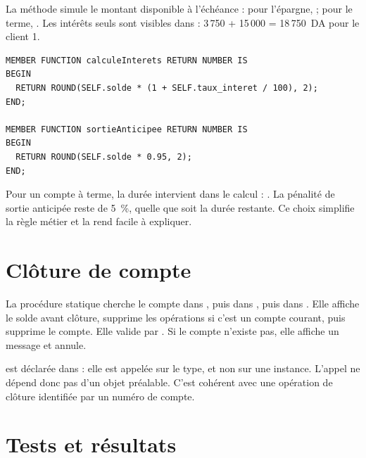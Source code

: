 \begin{clebox}
La méthode simule le montant disponible à l'échéance : pour l'épargne,
 ; pour le terme,
. Les intérêts seuls sont visibles
dans  : 3\,750 + 15\,000 = 18\,750~DA pour le client 1.
\end{clebox}

\begin{lstlisting}[caption={Calcul des intérêts et de la sortie anticipée.},label={lst:interets}]
MEMBER FUNCTION calculeInterets RETURN NUMBER IS
BEGIN
  RETURN ROUND(SELF.solde * (1 + SELF.taux_interet / 100), 2);
END;

MEMBER FUNCTION sortieAnticipee RETURN NUMBER IS
BEGIN
  RETURN ROUND(SELF.solde * 0.95, 2);
END;
\end{lstlisting}

Pour un compte à terme, la durée intervient dans le calcul :
. La pénalité de
sortie anticipée reste de 5~\%, quelle que soit la durée restante. Ce choix
simplifie la règle métier et la rend facile à expliquer.

\section{Clôture de compte}

La procédure statique  cherche le compte dans
, puis dans , puis dans
. Elle affiche le solde avant clôture, supprime les opérations
si c'est un compte courant, puis supprime le compte. Elle valide par
. Si le compte n'existe pas, elle affiche un message et annule.

\begin{attentionbox}
 est déclarée  dans  : elle
est appelée sur le type, et non sur une instance. L'appel
 ne dépend donc pas d'un objet
 préalable. C'est cohérent avec une opération de clôture
identifiée par un numéro de compte.
\end{attentionbox}

\section{Tests et résultats}

